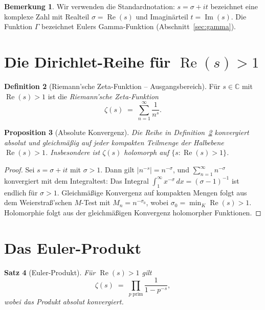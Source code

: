 \documentclass[12pt,a4paper]{amsart}
\newtheorem{theorem}{Satz}[section]
\newtheorem{proposition}[theorem]{Proposition}
\theoremstyle{definition}
\newtheorem{definition}[theorem]{Definition}
\newtheorem{remark}[theorem]{Bemerkung}
\newcommand{\C}{\mathbb{C}}
\DeclareMathOperator{\Re}{Re}
\DeclareMathOperator{\Im}{Im}
\begin{document}
\begin{remark}
Wir verwenden die Standardnotation: $s = \sigma + it$ bezeichnet eine
komplexe Zahl mit Realteil $\sigma = \Re(s)$ und Imagin\"arteil $t = \Im(s)$.
Die Funktion $\Gamma$ bezeichnet Eulers Gamma-Funktion
(Abschnitt~\ref{sec:gamma}).
\end{remark}

\section{Die Dirichlet-Reihe f\"ur \texorpdfstring{$\Re(s)>1$}{Re(s)>1}}

\begin{definition}[Riemann'sche Zeta-Funktion -- Ausgangsbereich]
\label{def:zeta_series}
F\"ur $s \in \C$ mit $\Re(s) > 1$ ist die \emph{Riemann'sche Zeta-Funktion}
\[
  \zeta(s) \;=\; \sum_{n=1}^{\infty} \frac{1}{n^s}.
\]
\end{definition}

\begin{proposition}[Absolute Konvergenz]
\label{prop:convergence}
Die Reihe in Definition~\ref{def:zeta_series} konvergiert absolut und
gleichm\"a\ss ig auf jeder kompakten Teilmenge der Halbebene $\Re(s) > 1$.
Insbesondere ist $\zeta(s)$ holomorph auf $\{s : \Re(s) > 1\}$.
\end{proposition}

\begin{proof}
Sei $s = \sigma + it$ mit $\sigma > 1$. Dann gilt $|n^{-s}| = n^{-\sigma}$,
und $\sum_{n=1}^\infty n^{-\sigma}$ konvergiert mit dem Integraltest:
Das Integral $\int_1^\infty x^{-\sigma}\,dx = (\sigma-1)^{-1}$ ist endlich
f\"ur $\sigma > 1$.
Gleichm\"a\ss ige Konvergenz auf kompakten Mengen folgt aus dem
Weierstra\ss'schen $M$-Test mit $M_n = n^{-\sigma_0}$, wobei
$\sigma_0 = \min_K \Re(s) > 1$.
Holomorphie folgt aus der gleichm\"a\ss igen Konvergenz
holomorpher Funktionen.
\end{proof}

\section{Das Euler-Produkt}

\begin{theorem}[Euler-Produkt]
\label{thm:euler_product}
F\"ur $\Re(s) > 1$ gilt
\[
  \zeta(s) \;=\; \prod_{p\;\text{prim}} \frac{1}{1 - p^{-s}},
\]
wobei das Produkt absolut konvergiert.
\end{theorem}
\end{document}
